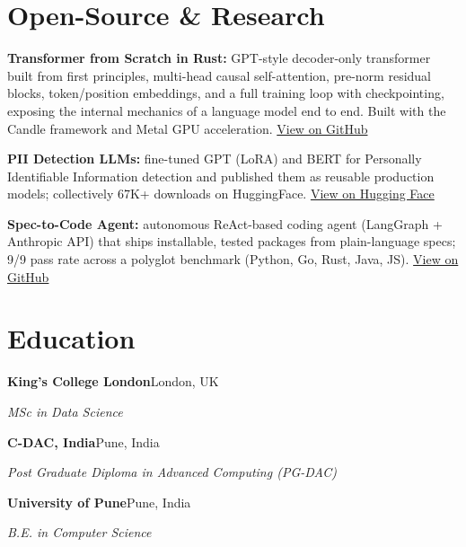 \documentclass[10pt,a4paper]{article}
\begin{document}
\section{Open-Source \& Research}
\begin{tight}
  \item \textbf{Transformer from Scratch in Rust:} GPT-style decoder-only transformer built from first principles, multi-head causal self-attention, pre-norm residual blocks, token/position embeddings, and a full training loop with checkpointing, exposing the internal mechanics of a language model end to end. Built with the Candle framework and Metal GPU acceleration. \href{https://github.com/abhijeetscode/transformer-rust}{View on GitHub}
  \item \textbf{PII Detection LLMs:} fine-tuned GPT (LoRA) and BERT for Personally Identifiable Information detection and published them as reusable production models; collectively 67K+ downloads on HuggingFace. \href{https://huggingface.co/ab-ai/pii_model}{View on Hugging Face}
  \item \textbf{Spec-to-Code Agent:} autonomous ReAct-based coding agent (LangGraph + Anthropic API) that ships installable, tested packages from plain-language specs; 9/9 pass rate across a polyglot benchmark (Python, Go, Rust, Java, JS). \href{https://github.com/abhijeetscode/Spec-to-Code-Agent}{View on GitHub}
\end{tight}

\section{Education}
{\color{company}\bfseries King's College London}\hfill {\color{muted}London, UK}\par
{\itshape MSc in Data Science}\par\vspace{2pt}
{\color{company}\bfseries C-DAC, India}\hfill {\color{muted}Pune, India}\par
{\itshape Post Graduate Diploma in Advanced Computing (PG-DAC)}\par\vspace{2pt}
{\color{company}\bfseries University of Pune}\hfill {\color{muted}Pune, India}\par
{\itshape B.E. in Computer Science}\par
\end{document}
